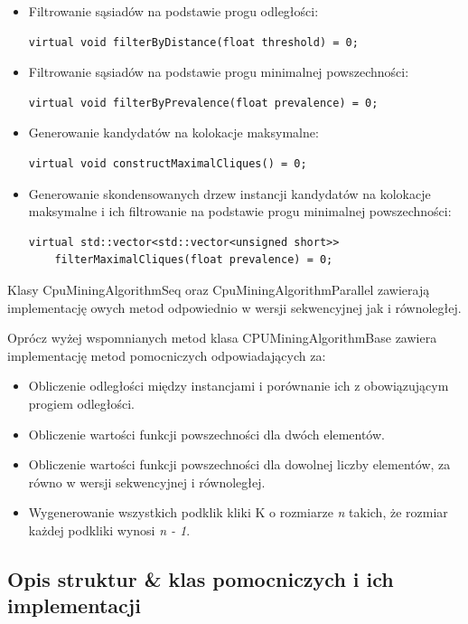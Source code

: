 \documentclass[12pt]{article}
\begin{document}
\begin{itemize}
\item
Filtrowanie sąsiadów na podstawie progu odległości:
\begin{lstlisting}
virtual void filterByDistance(float threshold) = 0;
\end{lstlisting}

\item
Filtrowanie sąsiadów na podstawie progu minimalnej powszechności:
\begin{lstlisting}
virtual void filterByPrevalence(float prevalence) = 0;
\end{lstlisting}

\item
Generowanie kandydatów na kolokacje maksymalne:
\begin{lstlisting}
virtual void constructMaximalCliques() = 0;
\end{lstlisting}

\item
Generowanie skondensowanych drzew instancji kandydatów na kolokacje maksymalne i ich filtrowanie na podstawie progu minimalnej powszechności:
\begin{lstlisting}
virtual std::vector<std::vector<unsigned short>>
    filterMaximalCliques(float prevalence) = 0;
\end{lstlisting}
\end{itemize}

Klasy CpuMiningAlgorithmSeq oraz CpuMiningAlgorithmParallel zawierają implementację owych metod odpowiednio w wersji sekwencyjnej jak i równoległej.

Oprócz wyżej wspomnianych metod klasa CPUMiningAlgorithmBase zawiera implementację metod pomocniczych odpowiadających za:

\begin{itemize}
\item Obliczenie odległości między instancjami i porównanie ich z obowiązującym progiem odległości.
\item Obliczenie wartości funkcji powszechności dla dwóch elementów.
\item Obliczenie wartości funkcji powszechności dla dowolnej liczby elementów, za równo w wersji sekwencyjnej i równoległej.
\item Wygenerowanie wszystkich podklik kliki K o rozmiarze \textit{n} takich, że rozmiar każdej podkliki wynosi \textit{n - 1}.
\end{itemize}

\subsection{Opis struktur \& klas pomocniczych i ich implementacji}
\end{document}
